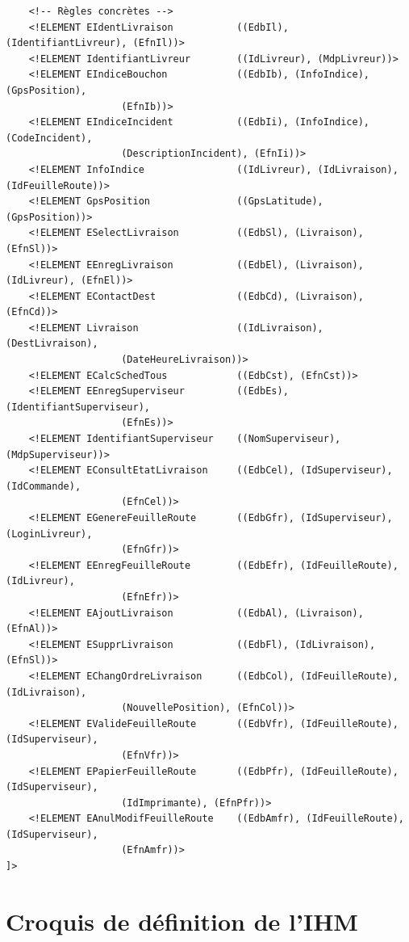 \documentclass{report}
\begin{document}
\begin{appendices}
\begin{verbatim}
    <!-- Règles concrètes -->
    <!ELEMENT EIdentLivraison           ((EdbIl), (IdentifiantLivreur), (EfnIl))>
    <!ELEMENT IdentifiantLivreur        ((IdLivreur), (MdpLivreur))>
    <!ELEMENT EIndiceBouchon            ((EdbIb), (InfoIndice), (GpsPosition), 
					(EfnIb))>
    <!ELEMENT EIndiceIncident           ((EdbIi), (InfoIndice), (CodeIncident), 
					(DescriptionIncident), (EfnIi))>
    <!ELEMENT InfoIndice                ((IdLivreur), (IdLivraison), (IdFeuilleRoute))>
    <!ELEMENT GpsPosition               ((GpsLatitude), (GpsPosition))>
    <!ELEMENT ESelectLivraison          ((EdbSl), (Livraison), (EfnSl))>
    <!ELEMENT EEnregLivraison           ((EdbEl), (Livraison), (IdLivreur), (EfnEl))>
    <!ELEMENT EContactDest              ((EdbCd), (Livraison), (EfnCd))>
    <!ELEMENT Livraison                 ((IdLivraison), (DestLivraison), 
					(DateHeureLivraison))>
    <!ELEMENT ECalcSchedTous            ((EdbCst), (EfnCst))>
    <!ELEMENT EEnregSuperviseur         ((EdbEs), (IdentifiantSuperviseur), 
					(EfnEs))>
    <!ELEMENT IdentifiantSuperviseur    ((NomSuperviseur), (MdpSuperviseur))>
    <!ELEMENT EConsultEtatLivraison     ((EdbCel), (IdSuperviseur), (IdCommande), 
					(EfnCel))>
    <!ELEMENT EGenereFeuilleRoute       ((EdbGfr), (IdSuperviseur), (LoginLivreur), 
					(EfnGfr))>
    <!ELEMENT EEnregFeuilleRoute        ((EdbEfr), (IdFeuilleRoute), (IdLivreur), 
					(EfnEfr))>
    <!ELEMENT EAjoutLivraison           ((EdbAl), (Livraison), (EfnAl))>
    <!ELEMENT ESupprLivraison           ((EdbFl), (IdLivraison), (EfnSl))>
    <!ELEMENT EChangOrdreLivraison      ((EdbCol), (IdFeuilleRoute), (IdLivraison), 
					(NouvellePosition), (EfnCol))>
    <!ELEMENT EValideFeuilleRoute       ((EdbVfr), (IdFeuilleRoute), (IdSuperviseur), 
					(EfnVfr))>
    <!ELEMENT EPapierFeuilleRoute       ((EdbPfr), (IdFeuilleRoute), (IdSuperviseur), 
					(IdImprimante), (EfnPfr))>
    <!ELEMENT EAnulModifFeuilleRoute    ((EdbAmfr), (IdFeuilleRoute), (IdSuperviseur),
					(EfnAmfr))>
]>

\end{verbatim}

\chapter{Croquis de définition de l'IHM}


\end{appendices}
\end{document}
